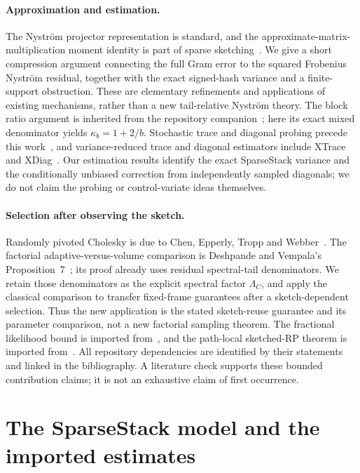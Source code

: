 \documentclass[11pt,a4paper]{article}
\theoremstyle{definition}
\theoremstyle{remark}
\newcommand{\1}{\mathbf 1}
\begin{document}
\paragraph{Approximation and estimation.}
The Nystr\"om projector representation is standard, and the
approximate-matrix-multiplication moment identity is part of sparse
sketching~\cite{ClarksonWoodruff2013,CEMT}. We give a short compression
argument connecting the full Gram error to the squared Frobenius
Nystr\"om residual, together with the exact signed-hash variance and a
finite-support obstruction. These are elementary refinements and
applications of existing mechanisms, rather than a new tail-relative
Nystr\"om theory. The block ratio argument is inherited from the
repository companion~\cite{PPD}; here its exact mixed denominator yields
$\kappa_b=1+2/b$. Stochastic trace and diagonal probing precede this
work~\cite{Hutchinson1989,Bekas2007}, and variance-reduced trace and
diagonal estimators include XTrace and XDiag~\cite{XTrace}. Our
estimation results identify the exact SparseStack variance and the
conditionally unbiased correction from independently sampled diagonals;
we do not claim the probing or control-variate ideas themselves.

\paragraph{Selection after observing the sketch.}
Randomly pivoted Cholesky is due to Chen, Epperly, Tropp and
Webber~\cite{CETW}. The factorial adaptive-versus-volume comparison
is Deshpande and Vempala's Proposition~7~\cite{DV2006}; its proof already
uses residual spectral-tail denominators. We retain those denominators
as the explicit spectral factor $\Lambda_C$, and apply the classical
comparison to transfer fixed-frame guarantees after a sketch-dependent
selection. Thus the new application is the stated sketch-reuse guarantee
and its parameter comparison, not a new factorial sampling theorem.
The fractional likelihood bound is imported from~\cite{RA01}, and
the path-local sketched-RP theorem is imported from~\cite{RobustRP}.
All repository dependencies are identified by their statements and
linked in the bibliography. A literature check supports these bounded
contribution claims; it is not an exhaustive claim of first occurrence.

\section{The SparseStack model and the imported estimates}\label{sec:model}
\end{document}
